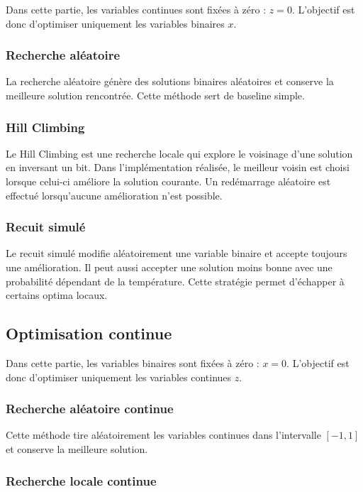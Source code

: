 \documentclass[a4paper,11pt]{article}
\begin{document}
Dans cette partie, les variables continues sont fixées à zéro : $z = 0$. 
L'objectif est donc d'optimiser uniquement les variables binaires $x$.

\subsubsection{Recherche aléatoire}

La recherche aléatoire génère des solutions binaires aléatoires et conserve la meilleure solution rencontrée. 
Cette méthode sert de baseline simple.

\subsubsection{Hill Climbing}

Le Hill Climbing est une recherche locale qui explore le voisinage d'une solution en inversant un bit. 
Dans l'implémentation réalisée, le meilleur voisin est choisi lorsque celui-ci améliore la solution courante. 
Un redémarrage aléatoire est effectué lorsqu'aucune amélioration n'est possible.

\subsubsection{Recuit simulé}

Le recuit simulé modifie aléatoirement une variable binaire et accepte toujours une amélioration. 
Il peut aussi accepter une solution moins bonne avec une probabilité dépendant de la température. 
Cette stratégie permet d'échapper à certains optima locaux.

\subsection{Optimisation continue}

Dans cette partie, les variables binaires sont fixées à zéro : $x = 0$. 
L'objectif est donc d'optimiser uniquement les variables continues $z$.

\subsubsection{Recherche aléatoire continue}

Cette méthode tire aléatoirement les variables continues dans l'intervalle $[-1,1]$ et conserve la meilleure solution.

\subsubsection{Recherche locale continue}
\end{document}
